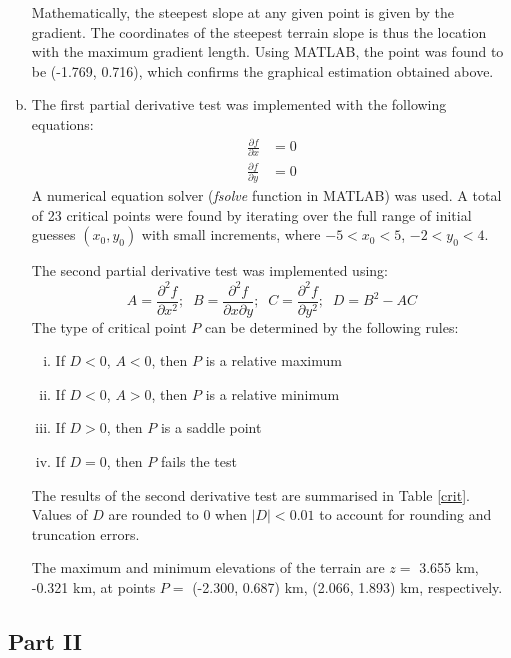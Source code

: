 \documentclass[12pt,onecolumn]{article}
\begin{document}
\begin{enumerate}[a.]
Mathematically, the steepest slope at any given point is given by the gradient. The coordinates of the steepest terrain slope is thus the location with the maximum gradient length. Using MATLAB, the point was found to be (-1.769, 0.716), which confirms the graphical estimation obtained above.

\item The first partial derivative test was implemented with the following equations:
\begin{align*}
	\frac{\partial f}{\partial x} &= 0\\
	\frac{\partial f}{\partial y} &= 0
\end{align*}
A numerical equation solver (\textit{fsolve} function in MATLAB) was used. A total of 23 critical points were found by iterating over the full range of initial guesses $(x_0, y_0)$ with small increments, where $-5 < x_0 < 5$, $-2 < y_0 < 4$.

The second partial derivative test was implemented using:
\begin{equation*}
	A = \frac{\partial^2f}{\partial x^2};\;\; B = \frac{\partial^2f}{\partial x\partial y};\;\; C = \frac{\partial^2f}{\partial y^2};\;\; D = B^2 - AC
\end{equation*}
The type of critical point $P$ can be determined by the following rules:
\begin{enumerate}[i.]
	\item If $D < 0$, $A < 0$, then $P$ is a relative maximum
	\item If $D < 0$, $A > 0$, then $P$ is a relative minimum
	\item If $D > 0$, then $P$ is a saddle point
	\item If $D = 0$, then $P$ fails the test
\end{enumerate}
The results of the second derivative test are summarised in Table \ref{crit}. Values of $D$ are rounded to 0 when $|D| < 0.01$ to account for rounding and truncation errors.

The maximum and minimum elevations of the terrain are $z = $ 3.655 km, -0.321 km, at points $P = $ (-2.300, 0.687) km, (2.066, 1.893) km, respectively.
\end{enumerate}

\subsection*{Part II}
\end{document}
